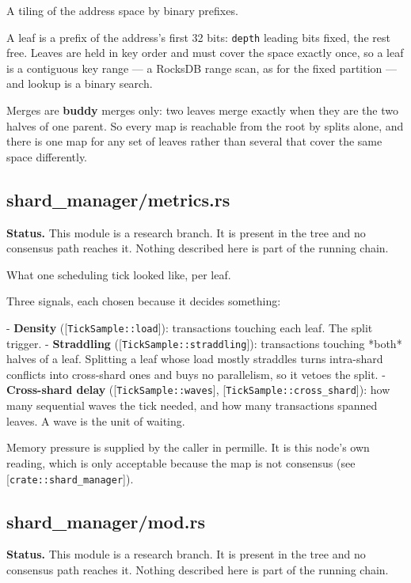 \documentclass[11pt,a4paper]{article}
\begin{document}
A tiling of the address space by binary prefixes.

A leaf is a prefix of the address's first 32 bits: \texttt{depth} leading bits
fixed, the rest free. Leaves are held in key order and must cover the space
exactly once, so a leaf is a contiguous key range — a RocksDB range scan, as
for the fixed partition — and lookup is a binary search.

Merges are \textbf{buddy} merges only: two leaves merge exactly when they are the
two halves of one parent. So every map is reachable from the root by splits
alone, and there is one map for any set of leaves rather than several that
cover the same space differently.

\subsection{shard\_manager/metrics.rs}
\begin{framed}\noindent\textbf{Status.} This module is a research branch. It is present in the tree and no consensus path reaches it. Nothing described here is part of the running chain.\end{framed}

What one scheduling tick looked like, per leaf.

Three signals, each chosen because it decides something:

- \textbf{Density} ([\texttt{TickSample::load}]): transactions touching each leaf. The
  split trigger.
- \textbf{Straddling} ([\texttt{TickSample::straddling}]): transactions touching *both*
  halves of a leaf. Splitting a leaf whose load mostly straddles turns
  intra-shard conflicts into cross-shard ones and buys no parallelism, so it
  vetoes the split.
- \textbf{Cross-shard delay} ([\texttt{TickSample::waves}], [\texttt{TickSample::cross\_shard}]):
  how many sequential waves the tick needed, and how many transactions
  spanned leaves. A wave is the unit of waiting.

Memory pressure is supplied by the caller in permille. It is this node's own
reading, which is only acceptable because the map is not consensus (see
[\texttt{crate::shard\_manager}]).

\subsection{shard\_manager/mod.rs}
\begin{framed}\noindent\textbf{Status.} This module is a research branch. It is present in the tree and no consensus path reaches it. Nothing described here is part of the running chain.\end{framed}
\end{document}
